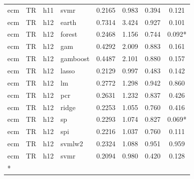 \begin{ThreePartTable}
\begin{longtable}[t]{llclcccc}
ecm & TR & h11 & svmr & 0.2165 & 0.983 & 0.394 & 0.121\\
\addlinespace
ecm & TR & h12 & earth & 0.7314 & 3.424 & 0.927 & 0.101\\
ecm & TR & h12 & forest & 0.2468 & 1.156 & 0.744 & 0.092*\\
ecm & TR & h12 & gam & 0.4292 & 2.009 & 0.883 & 0.161\\
ecm & TR & h12 & gamboost & 0.4487 & 2.101 & 0.880 & 0.157\\
ecm & TR & h12 & lasso & 0.2129 & 0.997 & 0.483 & 0.142\\
ecm & TR & h12 & lm & 0.2772 & 1.298 & 0.942 & 0.860\\
ecm & TR & h12 & pcr & 0.2631 & 1.232 & 0.837 & 0.426\\
ecm & TR & h12 & ridge & 0.2253 & 1.055 & 0.760 & 0.416\\
ecm & TR & h12 & sp & 0.2293 & 1.074 & 0.827 & 0.069*\\
ecm & TR & h12 & spi & 0.2216 & 1.037 & 0.760 & 0.111\\
ecm & TR & h12 & svmlw2 & 0.2324 & 1.088 & 0.951 & 0.959\\
ecm & TR & h12 & svmr & 0.2094 & 0.980 & 0.420 & 0.128\\*
\end{longtable}
\end{ThreePartTable}
\endgroup{}
